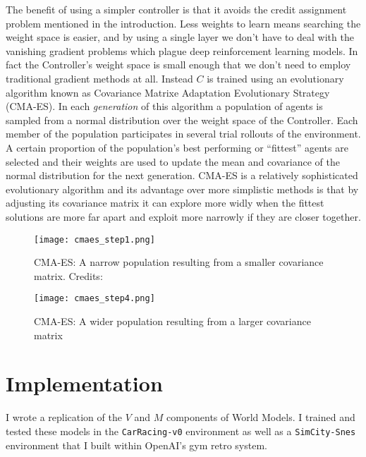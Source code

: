 \documentclass{article}
\numberwithin{figure}{section}
\theoremstyle{definition}
\begin{document}
The benefit of using a simpler controller is that it avoids the credit assignment problem mentioned in the introduction.
Less weights to learn means searching the weight space is easier, and by using a single layer we don't have to deal with the vanishing gradient problems which plague deep reinforcement learning models.
In fact the Controller's weight space is small enough that we don't need to employ traditional gradient methods at all.
Instead $C$ is trained using an evolutionary algorithm known as Covariance Matrixe Adaptation Evolutionary Strategy (CMA-ES).
In each \textit{generation} of this algorithm a population of agents is sampled from a normal distribution over the weight space of the Controller.
Each member of the population participates in several trial rollouts of the environment.
A certain proportion of the population's best performing or ``fittest'' agents are selected and their weights are used to update the mean and covariance of the normal distribution for the next generation.
CMA-ES is a relatively sophisticated evolutionary algorithm and its advantage over more simplistic methods is that by adjusting its covariance matrix it can explore more widly when the fittest solutions are more far apart and exploit more narrowly if they are closer together.


\begin{figure}[h]
  \centering
  \begin{minipage}{0.4\textwidth}
      \centering
      \texttt{[image: cmaes\_step1.png]} %
      \caption{CMA-ES: A narrow population resulting from a smaller covariance matrix. Credits: }%
  \end{minipage}\hfill
  \begin{minipage}{0.4\textwidth}
      \centering
      \texttt{[image: cmaes\_step4.png]} %
      \caption{CMA-ES: A wider population resulting from a larger covariance matrix} %
  \end{minipage}
\end{figure}




\section{Implementation}
I wrote a replication of the $V$ and $M$ components of World Models.
I trained and tested these models in the \texttt{CarRacing-v0} environment as well as a \texttt{SimCity-Snes} environment that I built within OpenAI's gym retro system. %
\end{document}
